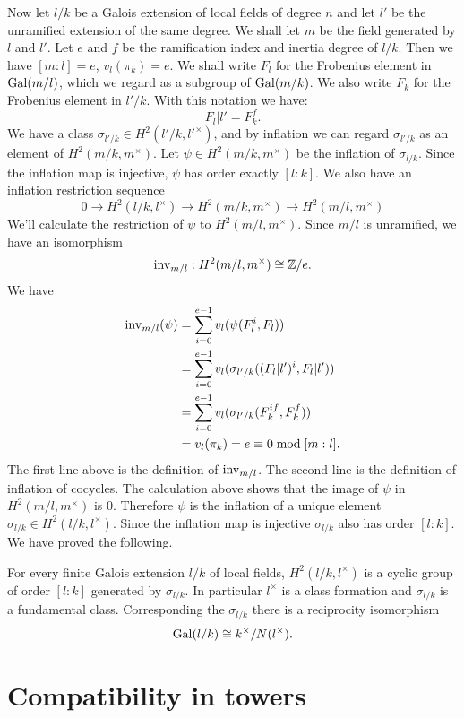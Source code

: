 Now let $l/k$ be a Galois extension of local fields of degree $n$ and let $l'$ be
the unramified extension of the same degree.
We shall let $m$ be the field generated by $l$ and $l'$.
Let $e$ and $f$ be the ramification index and inertia degree of $l/k$.
Then we have $[m:l] = e$, $v_l(\pi_k)= e$.
We shall write $F_l$ for the Frobenius element in $\mathrm{Gal}(m/l)$, which we regard as a subgroup
of $\mathrm{Gal}(m/k)$. We also write $F_k$ for the Frobenius element in $l'/k$.
With this notation we have:
\[
	F_l|l' = F_k^f.
\]
We have a class $\sigma_{l'/k} \in H^2(l'/k,l'^\times)$, and by inflation we can regard
$\sigma_{l'/k}$ as an element of $H^2(m/k,m^\times)$.
Let $\psi\in H^2(m/k,m^\times)$ be the inflation of $\sigma_{l/k}$.
Since the inflation map is injective, $\psi$ has order exactly $[l:k]$.
We also have an inflation restriction sequence
\[
	0 \to H^2(l/k, l^\times) \to H^2(m/k , m^\times) \to H^2(m/l, m^\times)
\]
We'll calculate the restriction of $\psi$ to $H^2(m/l, m^\times)$.
Since $m/l$ is unramified, we have an isomorphism
\[
	\mathrm{inv}_{m/l} : H^2(m/l, m^\times) \cong {\mathbb Z}/ e.
\]
We have
\begin{align*}
	\mathrm{inv}_{m/l}(\psi)
	&=\sum_{i=0}^{e-1} v_l (\psi (F_l^i,F_l))\\
	&=\sum_{i=0}^{e-1} v_l (\sigma_{l'/k}((F_l|l')^i,F_l|l'))\\
	&=\sum_{i=0}^{e-1} v_l (\sigma_{l'/k}(F_k^{if},F_k^f))\\
	&=v_l (\pi_k) = e \equiv 0 \bmod [m:l].
\end{align*}
The first line above is the definition of $\mathrm{inv}_{m/l}$.
The second line is the definition of inflation of cocycles.
The calculation above shows that the image of $\psi$ in $H^2(m/l, m^\times)$ is $0$.
Therefore $\psi$ is the inflation of a unique element $\sigma_{l/k} \in H^2(l/k,l^\times)$.
Since the inflation map is injective $\sigma_{l/k}$ also has order $[l:k]$.
We have proved the following.

\begin{theorem} \label{H2 local cyclic}
	For every finite Galois extension $l/k$ of local fields,
	$H^2(l/k,l^\times)$ is a cyclic group of order $[l:k]$ generated by $\sigma_{l/k}$.
	In particular $l^\times$ is a class formation and $\sigma_{l/k}$ is a fundamental class.
	Corresponding the $\sigma_{l/k}$ there is a reciprocity isomorphism
	\[
		\mathrm{Gal}(l/k) \cong k^\times / N(l^\times).
	\]
\end{theorem}



\section{Compatibility in towers}

